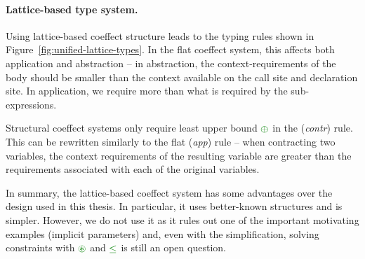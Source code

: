 
\paragraph{Lattice-based type system.}
\hspace{-1em}
Using lattice-based coeffect structure leads to the typing rules shown in Figure~\ref{fig:unified-lattice-types}.
In the flat coeffect system, this affects both application and abstraction -- in abstraction,
the context-requirements of the body should be smaller than the context available on the 
call site and declaration site. In application, we require more than what is required by
the sub-expressions.

Structural coeffect systems only require least upper bound $\cpar$ in the (\emph{contr}) rule.
This can be rewritten similarly to the flat (\emph{app}) rule --  when contracting two variables, the
context requirements of the resulting variable are greater than the requirements associated with
each of the original variables.

In summary, the lattice-based coeffect system has some advantages over the design used in this
thesis. In particular, it uses better-known structures and is simpler. However, we do not use
it as it rules out one of the important motivating examples (implicit parameters) and, even with
the simplification, solving constraints with $\cseq$ and $\cleq$ is still an open question.



%                                                                                             

